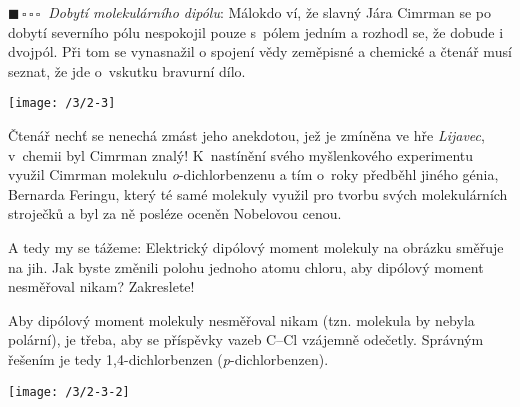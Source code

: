 \documentclass{book}
\newcommand{\jeden}{$\blacksquare \, \square \, \square \, \square \; \; $}
\renewenvironment{quotation}{\par}{\par} %
\begin{document}
\begin{quotation}
\jeden \textit{Dobytí molekulárního dipólu}: Málokdo ví, že slavný
Jára Cimrman se po dobytí severního pólu nespokojil pouze s~pólem
jedním a rozhodl se, že dobude i dvojpól. Při tom se vynasnažil o
spojení vědy zeměpisné a chemické a čtenář musí seznat, že jde o~vskutku
bravurní dílo. 
\noindent \begin{center}

\texttt{[image: /3/2-3]}

\par\end{center}
Čtenář nechť se nenechá zmást jeho anekdotou, jež je zmíněna ve hře
\textit{Lijavec}, v~chemii byl Cimrman znalý! K~nastínění svého myšlenkového
experimentu využil Cimrman molekulu \textit{o}-dichlorbenzenu a tím o~roky
předběhl jiného génia, Bernarda Feringu, který té samé molekuly využil
pro tvorbu svých molekulárních stroječků a byl za ně posléze oceněn
Nobelovou cenou.

A tedy my se tážeme: Elektrický dipólový moment molekuly na obrázku
směřuje na jih. Jak byste změnili polohu jednoho atomu chloru, aby
dipólový moment nesměřoval nikam? Zakreslete!
\end{quotation} \dotfill \par 
Aby dipólový moment molekuly nesměřoval nikam (tzn. molekula by nebyla polární), je třeba, aby
se příspěvky vazeb C--Cl vzájemně odečetly. Správným řešením je tedy
1,4-dichlorbenzen (\textit{p}-dichlorbenzen).

\begin{center}
\texttt{[image: /3/2-3-2]}
\end{center}
\end{document}
